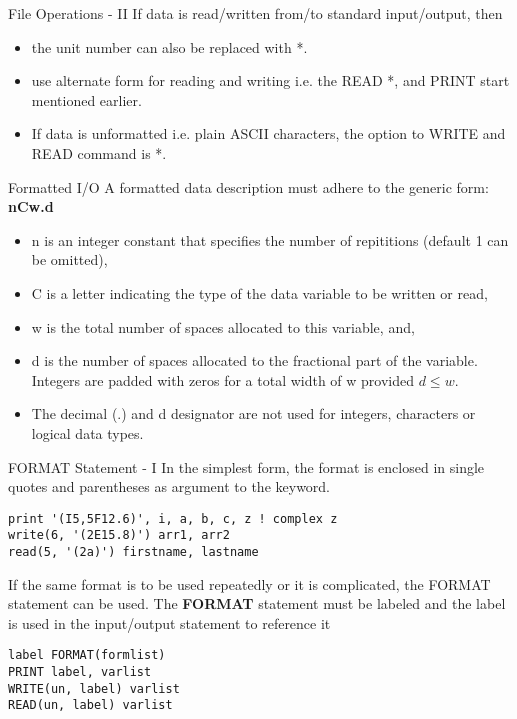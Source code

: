 \begin{frame}[fragile]{File Operations - II}
If data is read/written from/to standard input/output, then
\begin{itemize}
 \item the unit number can also be replaced with *.
 \item use alternate form for reading and writing i.e. the READ *, 
  and PRINT start mentioned earlier.
 \item If data is unformatted i.e. plain ASCII characters, the option to
  WRITE and READ command is *.
\end{itemize}
\end{frame}

\begin{frame}[fragile]{Formatted I/O}
A formatted data description must adhere to the generic form: \textbf{nCw.d}
\begin{itemize}
 \item n is an integer constant that specifies the number of repititions
(default 1 can be omitted),
 \item C is a letter indicating the type of the data variable to be written or
read,
 \item w is the total number of spaces allocated to this variable, and,
 \item d is the number of spaces allocated to the fractional part of the
  variable. Integers are padded with zeros for a total width of w
  provided $d \leq w$.
 \item The decimal (.) and d designator are not used for integers,
characters or logical data types.
\end{itemize}
\end{frame}


\begin{frame}[fragile]{FORMAT Statement - I}
In the simplest form, the format is enclosed in single quotes and
parentheses as argument to the keyword.
\begin{lstlisting}
print '(I5,5F12.6)', i, a, b, c, z ! complex z
write(6, '(2E15.8)') arr1, arr2
read(5, '(2a)') firstname, lastname
\end{lstlisting}
If the same format is to be used repeatedly or it is complicated,
the FORMAT statement can be used. The \textbf{FORMAT} statement must be 
labeled and the label is used in the input/output statement to reference it
\begin{lstlisting}
label FORMAT(formlist)
PRINT label, varlist
WRITE(un, label) varlist
READ(un, label) varlist
\end{lstlisting}
\end{frame}

